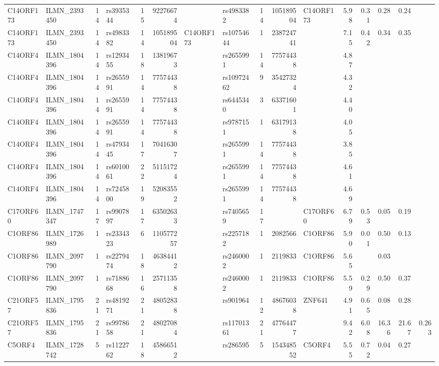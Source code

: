\documentclass{article}
\begin{document}
\begin{landscape}
{\begin{ThreePartTable}
\begin{longtable}{|llr|lrrl|lrrl|rrrr|r|}
  C14ORF173 & ILMN\_2393450 & 14 & rs3935344 & 15 & 92276674 &  & rs4983382 & 14 & 105189504 & C14ORF173 & 5.98 & 0.31 & 0.28 & 0.24 &  \\
  C14ORF173 & ILMN\_2393450 & 14 & rs4983382 & 14 & 105189504 & C14ORF173 & rs10754644 & 1 & 238724741 &  & 7.15 & 0.42 & 0.34 & 0.35 &  \\
  C14ORF4 & ILMN\_1804396 & 14 & rs1293455 & 18 & 13819673 &  & rs2655991 & 14 & 77574438 &  & 4.87 &  &  &  &  \\
  C14ORF4 & ILMN\_1804396 & 14 & rs2655991 & 14 & 77574438 &  & rs10972462 & 9 & 35427324 &  & 4.32 &  &  &  &  \\
  C14ORF4 & ILMN\_1804396 & 14 & rs2655991 & 14 & 77574438 &  & rs6445340 & 3 & 63371601 &  & 4.40 &  &  &  &  \\
  C14ORF4 & ILMN\_1804396 & 14 & rs2655991 & 14 & 77574438 &  & rs9787151 & 1 & 63179138 &  & 4.05 &  &  &  &  \\
  C14ORF4 & ILMN\_1804396 & 14 & rs4793445 & 17 & 70416307 &  & rs2655991 & 14 & 77574438 &  & 3.85 &  &  &  &  \\
  C14ORF4 & ILMN\_1804396 & 14 & rs6010061 & 22 & 51151724 &  & rs2655991 & 14 & 77574438 &  & 4.61 &  &  &  &  \\
  C14ORF4 & ILMN\_1804396 & 14 & rs7245800 & 19 & 52083552 &  & rs2655991 & 14 & 77574438 &  & 4.69 &  &  &  &  \\
  C17ORF60 & ILMN\_1747347 & 17 & rs9907897 & 17 & 63502633 &  & rs7405659 & 17 &  & C17ORF60 & 6.79 & 0.53 & 0.05 & 0.19 &  \\
  C1ORF86 & ILMN\_1726989 & 1 & rs2334323 & 6 & 110577257 &  & rs2257182 & 1 & 2082566 & C1ORF86 & 5.90 & 0.01 & 0.50 & 0.13 &  \\
  C1ORF86 & ILMN\_2097790 & 1 & rs2279474 & 18 & 46384412 &  & rs2460002 & 1 & 2119833 & C1ORF86 & 5.65 &  & 0.03 &  &  \\
  C1ORF86 & ILMN\_2097790 & 1 & rs7188668 & 16 & 25711358 &  & rs2460002 & 1 & 2119833 & C1ORF86 & 5.59 & 0.29 & 0.50 & 0.37 &  \\
  C21ORF57 & ILMN\_1795836 & 21 & rs4819271 & 21 & 48052838 &  & rs901964 & 12 & 48676038 & ZNF641 & 4.91 & 0.65 & 0.08 & 0.28 &  \\
  C21ORF57 & ILMN\_1795836 & 21 & rs9978658 & 21 & 48027084 &  & rs11701361 & 21 & 47764477 &  & 9.42 & 6.08 & 16.36 & 21.67 & 0.263 \\
  C5ORF4 & ILMN\_1728742 & 5 & rs1122762 & 18 & 45866512 &  & rs286595 & 5 & 154348552 & C5ORF4 & 5.55 & 0.72 & 0.04 & 0.27 &  \\

\end{longtable}
\end{ThreePartTable}}
\end{landscape}
\end{document}
